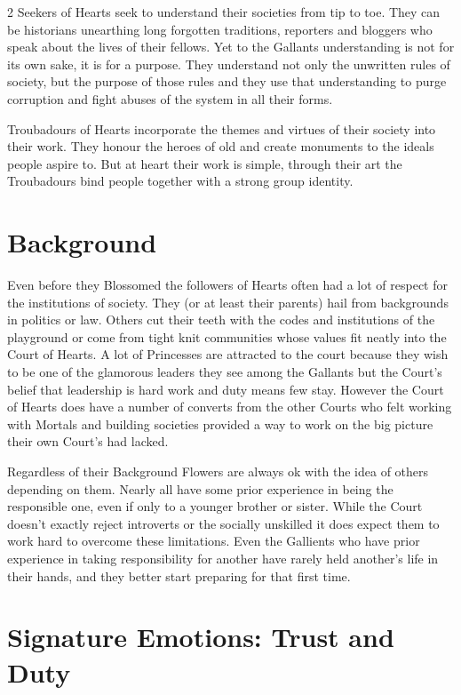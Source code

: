 \begin{multicols}{2}
Seekers of Hearts seek to understand their societies from tip to toe. They can be historians unearthing long forgotten traditions, reporters and bloggers who speak about the lives of their fellows. Yet to the Gallants understanding is not for its own sake, it is for a purpose. They understand not only the unwritten rules of society, but the purpose of those rules and they use that understanding to purge corruption and fight abuses of the system in all their forms. 

Troubadours of Hearts incorporate the themes and virtues of their society into their work. They honour the heroes of old and create monuments to the ideals people aspire to. But at heart their work is simple, through their art the Troubadours bind people together with a strong group identity. 

\section*{Background}

Even before they Blossomed the followers of Hearts often had a lot of respect for the institutions of society. They (or at least their parents) hail from backgrounds in politics or law. Others cut their teeth with the codes and institutions of the playground or come from tight knit communities whose values fit neatly into the Court of Hearts. A lot of Princesses are attracted to the court because they wish to be one of the glamorous leaders they see among the Gallants but the Court's belief that leadership is hard work and duty means few stay. However the Court of Hearts does have a number of converts from the other Courts who felt working with Mortals and building societies provided a way to work on the big picture their own Court's had lacked. 

Regardless of their Background Flowers are always ok with the idea of others depending on them. Nearly all have some prior experience in being the responsible one, even if only to a younger brother or sister. While the Court doesn't exactly reject introverts or the socially unskilled it does expect them to work hard to overcome these limitations. Even the Gallients who have prior experience in taking responsibility for another have rarely held another's life in their hands, and they better start preparing for that first time. 

\section*{Signature Emotions: Trust and Duty}


\end{multicols}
